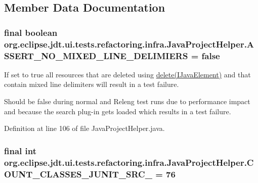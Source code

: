 \subsection{Member Data Documentation}
\hypertarget{classorg_1_1eclipse_1_1jdt_1_1ui_1_1tests_1_1refactoring_1_1infra_1_1JavaProjectHelper_ae1a510c7b10dbf64cd95cc379d58a350}{
\subsubsection[{ASSERT\_\-NO\_\-MIXED\_\-LINE\_\-DELIMIERS}]{\setlength{\rightskip}{0pt plus 5cm}final boolean {\bf org.eclipse.jdt.ui.tests.refactoring.infra.JavaProjectHelper.ASSERT\_\-NO\_\-MIXED\_\-LINE\_\-DELIMIERS} = false}}
\label{classorg_1_1eclipse_1_1jdt_1_1ui_1_1tests_1_1refactoring_1_1infra_1_1JavaProjectHelper_ae1a510c7b10dbf64cd95cc379d58a350}
If set to {\ttfamily true} all resources that are deleted using \hyperlink{}{delete(IJavaElement)} and that contain mixed line delimiters will result in a test failure. 

Should be {\ttfamily false} during normal and Releng test runs due to performance impact and because the search plug-\/in gets loaded which results in a test failure.  

Definition at line 106 of file JavaProjectHelper.java.

\hypertarget{classorg_1_1eclipse_1_1jdt_1_1ui_1_1tests_1_1refactoring_1_1infra_1_1JavaProjectHelper_af0167a048adf755595853c19ef30b60d}{
\subsubsection[{COUNT\_\-CLASSES\_\-JUNIT\_\-SRC\_\-381}]{\setlength{\rightskip}{0pt plus 5cm}final int {\bf org.eclipse.jdt.ui.tests.refactoring.infra.JavaProjectHelper.COUNT\_\-CLASSES\_\-JUNIT\_\-SRC\_} = 76}}
\label{classorg_1_1eclipse_1_1jdt_1_1ui_1_1tests_1_1refactoring_1_1infra_1_1JavaProjectHelper_af0167a048adf755595853c19ef30b60d}


